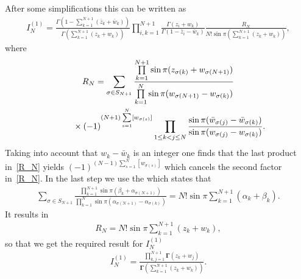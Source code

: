 \documentclass[11pt]{article}
\numberwithin{equation}{section}
\numberwithin{equation}{section}
\begin{document}
After some simplifications this can be written as
\begin{gather*}
I_N^{(1)}=\frac{\Gamma\left(1-\sum\limits_{k=1}^{N+1}(\bar z_k+\bar w_k)\right)}{\Gamma\left(\sum\limits_{k=1}^{N+1}( z_k+ w_k)\right)}
\prod_{i,k=1}^{N+1}\frac{\Gamma(z_i+w_k)}{\Gamma(1-\bar z_i-\bar w_k)}
\frac{ R_N}{N!\sin\pi\left(\sum\limits_{k=1}^{N+1}( z_k+ w_k)\right)},
\end{gather*}
where
\begin{gather}
R_N = \sum_{\sigma\in S_{N+1}}
\frac{\prod\limits_{k=1}^{N+1}
\sin\pi(z_{\sigma(k)}+w_{\sigma(N+1)})}
{\prod\limits_{k=1}^N\sin\pi(w_{\sigma(N+1)}-w_{\sigma(k)})}
\nonumber\\
\hphantom{R_N =}{} \times(-1)^{(N+1)\sum\limits_{s=1}^N[w_{\sigma(s)}]}\prod_{1\leq k<j\leq N}
\frac{\sin\pi(\bar w_{\sigma(j)}-\bar w_{\sigma(k)})}{\sin\pi( w_{\sigma(j)}- w_{\sigma(k)})} .\label{R_N}
\end{gather}
Taking into account that $w_k-\bar w_k$ is an integer one finds that the last product in~\eqref{R_N} yields $(-1)^{(N-1)\sum\limits_{s=1}^N [w_{\sigma(s)}]}$ which cancels the second factor in~\eqref{R_N}. In the last step we use the \cite[Lemma~5.10]{Gustafson94} which states that
\begin{gather*}
\sum_{\sigma\in S_{N+1}}
\frac{\prod\limits_{k=1}^{N+1}
\sin\pi(\beta_{k}+\alpha_{\sigma(N+1)})}
{\prod\limits_{k=1}^N\sin\pi(\alpha_{\sigma(N+1)}-\alpha_{\sigma(k)})} =
N!\sin\pi \sum_{k=1}^{N+1}(\alpha_k+\beta_k).
\end{gather*}
It results in
\begin{gather*}
R_N=N!\sin\pi \sum_{k=1}^{N+1}( z_k+ w_k),
\end{gather*}
so that we get the required result for $I_N^{(1)}$
 \begin{gather*}
I_N^{(1)}=\frac{\prod\limits_{k,j=1}^{N+1}\boldsymbol{\Gamma}(z_k+ w_j)}{
\boldsymbol{\Gamma}\left(\sum\limits_{k=1}^{N+1} (z_k+w_k) \right)} .
\end{gather*}
\end{document}
